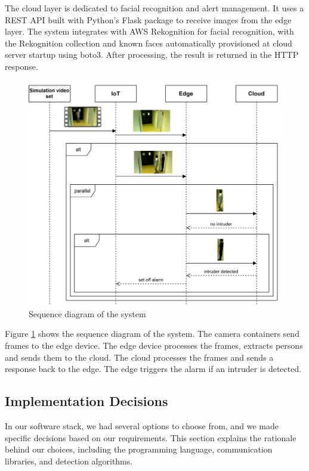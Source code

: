 \documentclass[conference]{IEEEtran}
\begin{document}
The cloud layer is dedicated to facial recognition and alert management. It uses a REST API built with Python's Flask package to receive images from the edge layer. The system integrates with AWS Rekognition for facial recognition, with the Rekognition collection and known faces automatically provisioned at cloud server startup using boto3. After processing, the result is returned in the HTTP response.


\begin{figure}[!h]
    \includegraphics[width=1\linewidth]{./res/sequenz_diagram.png}
    \caption{Sequence diagram of the system}
    \label{fig:sequence_diagram}
\end{figure}

Figure \ref{fig:sequence_diagram} shows the sequence diagram of the system. The camera containers send frames to the edge device. The edge device processes the frames, extracts persons and sends them to the cloud. The cloud processes the frames and sends a response back to the edge. The edge triggers the alarm if an intruder is detected. 


\subsection{Implementation Decisions}
In our software stack, we had several options to choose from, and we made specific decisions based on our requirements. This section explains the rationale behind our choices, including the programming language, communication libraries, and detection algorithms.
\\
\end{document}
